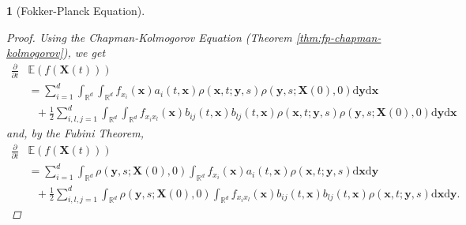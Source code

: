 \documentclass[english]{article}
\numberwithin{equation}{section}
\numberwithin{figure}{section}
\theoremstyle{bolddescit}
\newtheorem{theorem}{\protect\theoremname}[section]
\theoremstyle{definition}
\theoremstyle{definition}
\theoremstyle{plain}
\theoremstyle{plain}
\theoremstyle{bolddesc}
\theoremstyle{plain}
\theoremstyle{remark}
\providecommand{\theoremname}{Theorem}
\begin{document}
\begin{theorem}[Fokker-Planck Equation]
\begin{proof}
    Using the Chapman-Kolmogorov Equation (Theorem \ref{thm:fp-chapman-kolmogorov}), we get
    \begin{align*}
      \frac{\partial}{\partial t}&\mathbb{E}(f(\mathbf{X}(t)))\\
      &= \sum_{i=1}^{d} \int_{\mathbb{R}^d} \int_{\mathbb{R}^d} f_{x_i}(\mathbf{x}) a_i(t,\mathbf{x})\rho(\mathbf{x},t;\mathbf{y},s) \rho(\mathbf{y},s;\mathbf{X}(0),0) \mathrm{d}\mathbf{y} \mathrm{d}\mathbf{x}\\
        &\ \ \ + \frac{1}{2} \sum_{i,l,j=1}^{d} \int_{\mathbb{R}^d} \int_{\mathbb{R}^d} f_{x_i x_l}(\mathbf{x}) b_{ij}(t,\mathbf{x}) b_{lj}(t,\mathbf{x}) \rho(\mathbf{x},t;\mathbf{y},s) \rho(\mathbf{y},s;\mathbf{X}(0),0) \mathrm{d}\mathbf{y} \mathrm{d}\mathbf{x}
    \end{align*}
    and, by the Fubini Theorem,
    \begin{align*}
      \frac{\partial}{\partial t}&\mathbb{E}(f(\mathbf{X}(t)))\\
      &= \sum_{i=1}^{d} \int_{\mathbb{R}^d}  \rho(\mathbf{y},s;\mathbf{X}(0),0) \int_{\mathbb{R}^d} f_{x_i}(\mathbf{x}) a_i(t,\mathbf{x}) \rho(\mathbf{x},t;\mathbf{y},s) \mathrm{d}\mathbf{x} \mathrm{d}\mathbf{y}\\
        &\ \ \ + \frac{1}{2} \sum_{i,l,j=1}^{d} \int_{\mathbb{R}^d} \rho(\mathbf{y},s;\mathbf{X}(0),0) \int_{\mathbb{R}^d} f_{x_i x_l}(\mathbf{x}) b_{ij}(t,\mathbf{x}) b_{lj}(t,\mathbf{x}) \rho(\mathbf{x},t;\mathbf{y},s) \mathrm{d}\mathbf{x} \mathrm{d}\mathbf{y}.
    \end{align*}


\end{proof}
\end{theorem}
\end{document}
